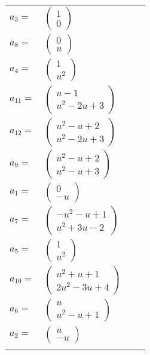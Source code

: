 \documentclass[1p]{elsarticle_modified}
\theoremstyle{definition}
\begin{document}
\begin{tabular}{m{7pt} m{180pt} m{7pt} m{180pt} }
\flushright $a_{3}=$&$\begin{pmatrix}1\\0\end{pmatrix}$ \\
\flushright $a_{8}=$&$\begin{pmatrix}0\\u\end{pmatrix}$ \\
\flushright $a_{4}=$&$\begin{pmatrix}1\\u^2\end{pmatrix}$ \\
\flushright $a_{11}=$&$\begin{pmatrix}u-1\\u^2-2 u+3\end{pmatrix}$ \\
\flushright $a_{12}=$&$\begin{pmatrix}u^2- u+2\\u^2-2 u+3\end{pmatrix}$ \\
\flushright $a_{9}=$&$\begin{pmatrix}u^2- u+2\\u^2- u+3\end{pmatrix}$ \\
\flushright $a_{1}=$&$\begin{pmatrix}0\\- u\end{pmatrix}$ \\
\flushright $a_{7}=$&$\begin{pmatrix}- u^2- u+1\\u^2+3 u-2\end{pmatrix}$ \\
\flushright $a_{5}=$&$\begin{pmatrix}1\\u^2\end{pmatrix}$ \\
\flushright $a_{10}=$&$\begin{pmatrix}u^2+u+1\\2 u^2-3 u+4\end{pmatrix}$ \\
\flushright $a_{6}=$&$\begin{pmatrix}u\\u^2- u+1\end{pmatrix}$ \\
\flushright $a_{2}=$&$\begin{pmatrix}u\\- u\end{pmatrix}$\\&\end{tabular}
\end{document}
